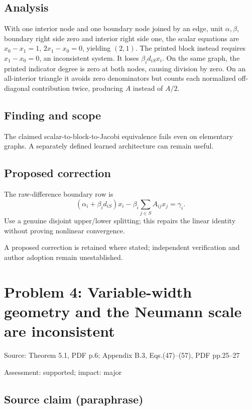 \documentclass[11pt]{article}
\begin{document}
\subsection*{Analysis}

With one interior node and one boundary node joined by an edge, unit \(\alpha,\beta\), boundary right side zero and interior right side one, the scalar equations are \(x_0-x_1=1\), \(2x_1-x_0=0\), yielding \((2,1)\). The printed block instead requires \(x_1-x_0=0\), an inconsistent system. It loses \(\beta_i d_{iS}x_i\). On the same graph, the printed indicator degree is zero at both nodes, causing division by zero. On an all-interior triangle it avoids zero denominators but counts each normalized off-diagonal contribution twice, producing \(A\) instead of \(A/2\).

\subsection*{Finding and scope}

The claimed scalar-to-block-to-Jacobi equivalence fails even on elementary graphs. A separately defined learned architecture can remain useful.

\subsection*{Proposed correction}

The raw-difference boundary row is \[(\alpha_i+\beta_i d_{iS})x_i-\beta_i\sum_{j\in S}A_{ij}x_j=\gamma_i.\] Use a genuine disjoint upper/lower splitting; this repairs the linear identity without proving nonlinear convergence.

A proposed correction is retained where stated; independent verification and author adoption remain unestablished.

\section*{Problem 4: Variable-width geometry and the Neumann scale are inconsistent}

Source: Theorem 5.1, PDF p.6; Appendix B.3, Eqs.(47)–(57), PDF pp.25–27

Assessment: supported; impact: major

\subsection*{Source claim (paraphrase)}
\end{document}

